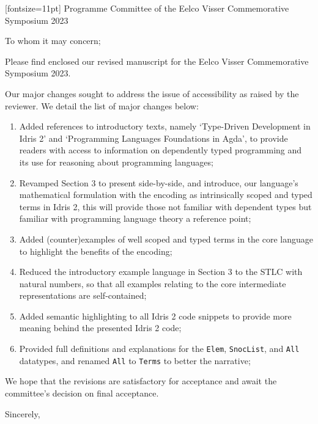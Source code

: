 \documentclass[UKenglish,final,a4paper,oneside]{scrlttr2}
\begin{document}
\begin{letter}[fontsize=11pt]%
  {%
    Programme Committee of the Eelco Visser Commemorative Symposium 2023
  }

  \opening{To whom it may concern;}

  Please find enclosed our revised manuscript for the Eelco Visser Commemorative Symposium 2023.

  Our major changes sought to address the issue of accessibility as raised by the reviewer.
  We detail the list of major changes below:

  \begin{enumerate}
    \item Added references to introductory texts, namely `Type-Driven Development in Idris 2'
       and `Programming Languages Foundations in Agda', to provide readers with access to information on dependently typed programming and its use for reasoning about programming languages;
     \item Revamped Section 3 to present side-by-side, and introduce, our language's mathematical formulation with the encoding as intrinsically scoped and typed terms in Idris 2, this will provide those not familiar with dependent types but familiar with programming language theory a reference point;
     \item Added (counter)examples of well scoped and typed terms in the core language to highlight the benefits of the encoding;

     \item Reduced the introductory example language in Section 3 to the STLC with natural numbers, so that all examples relating to the core intermediate representations are self-contained;

     \item Added semantic highlighting to all Idris 2 code snippets to provide more meaning behind the presented Idris 2 code;

     \item Provided full definitions and explanations for the \texttt{Elem}, \texttt{SnocList}, and \texttt{All} datatypes, and renamed \texttt{All} to \texttt{Terms} to better the narrative;
  \end{enumerate}

  We hope that the revisions are satisfactory for acceptance and await the committee's decision on final acceptance.

\closing{Sincerely,}
\end{letter}
\end{document}
